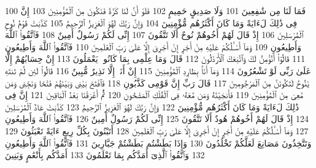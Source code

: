 {\tiny\colorbox{cl_aya}{100}} فَمَا لَنَا مِن شَٰفِعِينَ
{\tiny\colorbox{cl_aya}{101}} وَلَا صَدِيقٍ حَمِيمٍ
{\tiny\colorbox{cl_aya}{102}} فَلَوْ أَنَّ لَنَا كَرَّةً فَنَكُونَ مِنَ ٱلْمُؤْمِنِينَ
{\tiny\colorbox{cl_aya}{103}} إِنَّ فِى ذَٰلِكَ لَءَايَةً وَمَا كَانَ أَكْثَرُهُم مُّؤْمِنِينَ
{\tiny\colorbox{cl_aya}{104}} وَإِنَّ رَبَّكَ لَهُوَ ٱلْعَزِيزُ ٱلرَّحِيمُ
{\tiny\colorbox{cl_aya}{105}} كَذَّبَتْ قَوْمُ نُوحٍ ٱلْمُرْسَلِينَ
{\tiny\colorbox{cl_aya}{106}} إِذْ قَالَ لَهُمْ أَخُوهُمْ نُوحٌ أَلَا تَتَّقُونَ
{\tiny\colorbox{cl_aya}{107}} إِنِّى لَكُمْ رَسُولٌ أَمِينٌ
{\tiny\colorbox{cl_aya}{108}} فَٱتَّقُوا۟ ٱللَّهَ وَأَطِيعُونِ
{\tiny\colorbox{cl_aya}{109}} وَمَآ أَسْـَٔلُكُمْ عَلَيْهِ مِنْ أَجْرٍ إِنْ أَجْرِىَ إِلَّا عَلَىٰ رَبِّ ٱلْعَٰلَمِينَ
{\tiny\colorbox{cl_aya}{110}} فَٱتَّقُوا۟ ٱللَّهَ وَأَطِيعُونِ
{\tiny\colorbox{cl_aya}{111}} قَالُوٓا۟ أَنُؤْمِنُ لَكَ وَٱتَّبَعَكَ ٱلْأَرْذَلُونَ
{\tiny\colorbox{cl_aya}{112}} قَالَ وَمَا عِلْمِى بِمَا كَانُوا۟ يَعْمَلُونَ
{\tiny\colorbox{cl_aya}{113}} إِنْ حِسَابُهُمْ إِلَّا عَلَىٰ رَبِّى لَوْ تَشْعُرُونَ
{\tiny\colorbox{cl_aya}{114}} وَمَآ أَنَا۠ بِطَارِدِ ٱلْمُؤْمِنِينَ
{\tiny\colorbox{cl_aya}{115}} إِنْ أَنَا۠ إِلَّا نَذِيرٌ مُّبِينٌ
{\tiny\colorbox{cl_aya}{116}} قَالُوا۟ لَئِن لَّمْ تَنتَهِ يَٰنُوحُ لَتَكُونَنَّ مِنَ ٱلْمَرْجُومِينَ
{\tiny\colorbox{cl_aya}{117}} قَالَ رَبِّ إِنَّ قَوْمِى كَذَّبُونِ
{\tiny\colorbox{cl_aya}{118}} فَٱفْتَحْ بَيْنِى وَبَيْنَهُمْ فَتْحًا وَنَجِّنِى وَمَن مَّعِىَ مِنَ ٱلْمُؤْمِنِينَ
{\tiny\colorbox{cl_aya}{119}} فَأَنجَيْنَٰهُ وَمَن مَّعَهُۥ فِى ٱلْفُلْكِ ٱلْمَشْحُونِ
{\tiny\colorbox{cl_aya}{120}} ثُمَّ أَغْرَقْنَا بَعْدُ ٱلْبَاقِينَ
{\tiny\colorbox{cl_aya}{121}} إِنَّ فِى ذَٰلِكَ لَءَايَةً وَمَا كَانَ أَكْثَرُهُم مُّؤْمِنِينَ
{\tiny\colorbox{cl_aya}{122}} وَإِنَّ رَبَّكَ لَهُوَ ٱلْعَزِيزُ ٱلرَّحِيمُ
{\tiny\colorbox{cl_aya}{123}} كَذَّبَتْ عَادٌ ٱلْمُرْسَلِينَ
{\tiny\colorbox{cl_aya}{124}} إِذْ قَالَ لَهُمْ أَخُوهُمْ هُودٌ أَلَا تَتَّقُونَ
{\tiny\colorbox{cl_aya}{125}} إِنِّى لَكُمْ رَسُولٌ أَمِينٌ
{\tiny\colorbox{cl_aya}{126}} فَٱتَّقُوا۟ ٱللَّهَ وَأَطِيعُونِ
{\tiny\colorbox{cl_aya}{127}} وَمَآ أَسْـَٔلُكُمْ عَلَيْهِ مِنْ أَجْرٍ إِنْ أَجْرِىَ إِلَّا عَلَىٰ رَبِّ ٱلْعَٰلَمِينَ
{\tiny\colorbox{cl_aya}{128}} أَتَبْنُونَ بِكُلِّ رِيعٍ ءَايَةً تَعْبَثُونَ
{\tiny\colorbox{cl_aya}{129}} وَتَتَّخِذُونَ مَصَانِعَ لَعَلَّكُمْ تَخْلُدُونَ
{\tiny\colorbox{cl_aya}{130}} وَإِذَا بَطَشْتُم بَطَشْتُمْ جَبَّارِينَ
{\tiny\colorbox{cl_aya}{131}} فَٱتَّقُوا۟ ٱللَّهَ وَأَطِيعُونِ
{\tiny\colorbox{cl_aya}{132}} وَٱتَّقُوا۟ ٱلَّذِىٓ أَمَدَّكُم بِمَا تَعْلَمُونَ
{\tiny\colorbox{cl_aya}{133}} أَمَدَّكُم بِأَنْعَٰمٍ وَبَنِينَ
